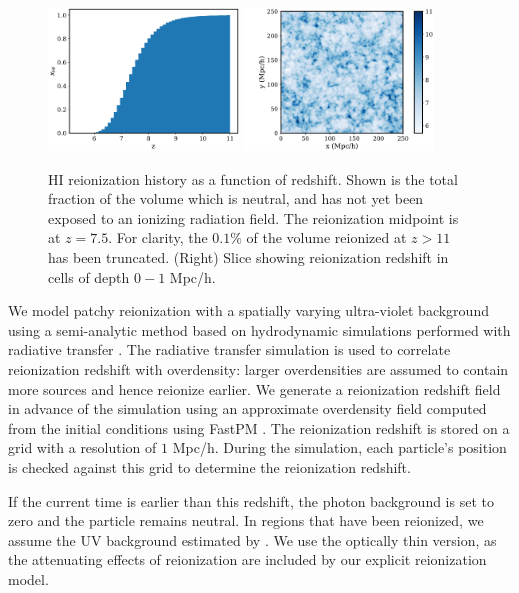 \documentclass[fleqn,usenatbib]{mnras}
\begin{document}
\begin{figure}
\centering
  \includegraphics[width=0.45\textwidth]{plots/reion_hist.pdf}    
    \includegraphics[width=0.45\textwidth]{plots/reion_slice.pdf}    
  \caption{HI reionization history as a function of redshift. Shown is the total fraction of the volume which is neutral, and has not yet been exposed to an ionizing radiation field. The reionization midpoint is at $z=7.5$. For clarity, the $0.1\%$ of the volume reionized at $z > 11$ has been truncated. (Right) Slice showing reionization redshift in cells of depth $0-1$ Mpc/h.}   
  \label{fig:reion_hist}
\end{figure}

We model patchy reionization with a spatially varying ultra-violet background using a semi-analytic method based on hydrodynamic simulations performed with radiative transfer \citep[for more details see][]{2013ApJ...776...81B}. The radiative transfer simulation is used to correlate reionization redshift with overdensity:  larger overdensities are assumed to contain more sources and hence reionize earlier. We generate a reionization redshift field in advance of the simulation using an approximate overdensity field computed from the initial conditions using FastPM \citep{2016MNRAS.463.2273F}. The reionization redshift is stored on a grid with a resolution of $1$ Mpc/h. During the simulation, each particle's position is checked against this grid to determine the reionization redshift. 

If the current time is earlier than this redshift, the photon background is set to zero and the particle remains neutral. In regions that have been reionized, we assume the UV background estimated by \cite{2020MNRAS.493.1614F}. We use the optically thin version, as the attenuating effects of reionization are included by our explicit reionization model. 
\end{document}

